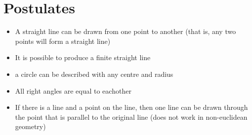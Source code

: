 \documentclass{book}
\begin{document}
\section{Postulates}
\begin{itemize}
	\item A straight line can be drawn from one point to another (that is, any two points will form a straight line)
	\item It is possible to produce a finite straight line
	\item a circle can be described with any centre and radius
	\item All right angles are equal to eachother
	\item If there is a line and a point on the line, then one line can be drawn through the point that is parallel to the original line (does not work in non-euclidean geometry)
\end{itemize}
\end{document}
